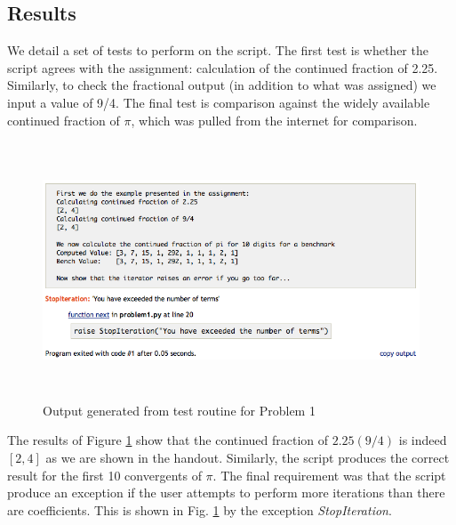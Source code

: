 \subsection{Results} %
\label{sub:results}
We detail a set of tests to perform on the script. The first test is whether the script agrees with the assignment: calculation of the continued fraction of 2.25. Similarly, to check the fractional output (in addition to what was assigned) we input a value of 9/4. The final test is comparison against the widely available continued fraction of $\pi$, which was pulled from the internet for comparison.

\begin{figure}[H]
    \centering
        \includegraphics[height=3in, trim=0 .2in 0 0]{include/prob1test.png}
    \caption{Output generated from test routine for Problem 1}
    \label{fig:include_prob1test}
\end{figure}\noindent
The results of Figure \ref{fig:include_prob1test} show that the continued fraction of $2.25 (9/4)$ is indeed $[2,4]$ as we are shown in the handout. Similarly, the script produces the correct result for the first 10 convergents of $\pi$.
The final requirement was that the script produce an exception if the user attempts to perform more iterations than there are coefficients. This is shown in Fig. \ref{fig:include_prob1test} by the exception \emph{StopIteration}.
